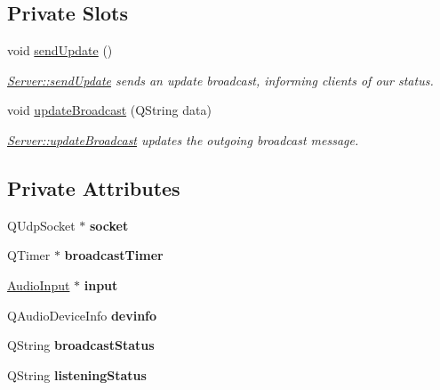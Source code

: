 \subsection*{Private Slots}
\begin{DoxyCompactItemize}
\item 
\hypertarget{class_server_a69da6d068b11feb5997dbfd6c8f863ac}{void \hyperlink{class_server_a69da6d068b11feb5997dbfd6c8f863ac}{send\+Update} ()}\label{class_server_a69da6d068b11feb5997dbfd6c8f863ac}

\begin{DoxyCompactList}\small\item\em \hyperlink{class_server_a69da6d068b11feb5997dbfd6c8f863ac}{Server\+::send\+Update} sends an update broadcast, informing clients of our status. \end{DoxyCompactList}\item 
void \hyperlink{class_server_a879b092399f867d8861e633192c10d47}{update\+Broadcast} (Q\+String data)
\begin{DoxyCompactList}\small\item\em \hyperlink{class_server_a879b092399f867d8861e633192c10d47}{Server\+::update\+Broadcast} updates the outgoing broadcast message. \end{DoxyCompactList}\end{DoxyCompactItemize}
\subsection*{Private Attributes}
\begin{DoxyCompactItemize}
\item 
\hypertarget{class_server_a66b3bdb5780364b9b13ce3836d23d30b}{Q\+Udp\+Socket $\ast$ {\bfseries socket}}\label{class_server_a66b3bdb5780364b9b13ce3836d23d30b}

\item 
\hypertarget{class_server_a9a123df402663d5cf77d37136a215660}{Q\+Timer $\ast$ {\bfseries broadcast\+Timer}}\label{class_server_a9a123df402663d5cf77d37136a215660}

\item 
\hypertarget{class_server_ae768ef05853969d0f7f0870b2e1b1d06}{\hyperlink{class_audio_input}{Audio\+Input} $\ast$ {\bfseries input}}\label{class_server_ae768ef05853969d0f7f0870b2e1b1d06}

\item 
\hypertarget{class_server_aaf9d54e01e90583f80efb6c63d15bae8}{Q\+Audio\+Device\+Info {\bfseries devinfo}}\label{class_server_aaf9d54e01e90583f80efb6c63d15bae8}

\item 
\hypertarget{class_server_a3ff13bf8f7dcaf334dd341f8b89907ce}{Q\+String {\bfseries broadcast\+Status}}\label{class_server_a3ff13bf8f7dcaf334dd341f8b89907ce}

\item 
\hypertarget{class_server_a5c32c8303cc0d59379af55769d678820}{Q\+String {\bfseries listening\+Status}}\label{class_server_a5c32c8303cc0d59379af55769d678820}

\end{DoxyCompactItemize}


